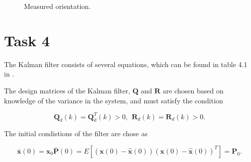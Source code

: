 \documentclass{article}
\begin{document}
\begin{figure}[!ht]
    \centering
    \caption{Measured orientation.}
    \label{fig:orientation_task3}
\end{figure}


\section*{Task 4}
The Kalman filter consists of several equations, which can be found in table 4.1 in \cite{heftet}.

The design matrices of the Kalman filter, $\bm{Q}$ and $\bm{R}$ are chosen based on knowledge of the variance in the system, and must satisfy the condition

\begin{equation}
	\bm{Q}_d(k) = \bm{Q}^T_d(k) > 0, \hspace{5pt} \bm{R}_d(k) = \bm{R}_d(k) > 0.
\end{equation}

The initial condistions of the filter are chose as

\begin{subequations}
\begin{equation}
	\bar{\bm{x}}(0) = \bm{x}_0
\end{equation}
\begin{equation}
	\bar{\bm{P}}(0) = E[(\bm{x}(0)-\hat{\bm{x}}(0))(\bm{x}(0)-\hat{\bm{x}}(0))^T] = \bm{P}_0.
\end{equation}
\end{subequations}
	
\end{document}

